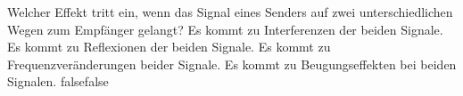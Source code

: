     {Welcher Effekt tritt ein, wenn das Signal eines Senders auf zwei unterschiedlichen Wegen zum Empfänger gelangt?}
    {Es kommt zu Interferenzen der beiden Signale.}
    {Es kommt zu Reflexionen der beiden Signale.}
    {Es kommt zu Frequenzveränderungen beider Signale.}
    {Es kommt zu Beugungseffekten bei beiden Signalen.}
    {false}{false}